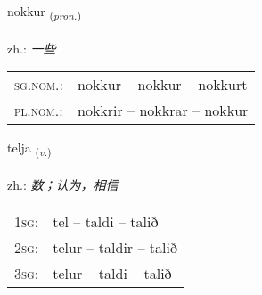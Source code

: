 \documentclass[frontgrid, backgrid]{flacards}\usepackage[]{graphicx}\usepackage[]{xcolor}
\begin{document}
\renewcommand{\flhead}{\vskip5pt \fboxsep=0pt {\small\bfseries\footnotesize Fornafn | 代词}}
\renewcommand{\fcfoot}{\vskip5pt \fboxsep=0pt \hspace{2pt}{\small\bfseries\footnotesize 1K}}

\renewcommand{\blhead}{\vskip5pt {\small\bfseries\footnotesize Fornafn | 代词 }}
\renewcommand{\bcfoot}{\vskip5pt \hspace{2pt}{\small\bfseries\footnotesize 1K}}


{nokkur \small{\textsubscript{(\textit{pron.})}} \\[1ex] %
\textphonetic{[nɔhkʏr]} \\
zh.: \emph{一些} \\  [2ex]
\renewcommand*{\arraystretch}{0.8}
\begin{tabular}{ll}
\textsc{sg.nom.}: & nokkur  --  nokkur -- nokkurt \\ 
\textsc{pl.nom.}: & nokkrir -- nokkrar -- nokkur
\end{tabular}
}

\renewcommand{\flhead}{\vskip5pt \fboxsep=0pt {\small\bfseries\footnotesize Sagnorð | 动词}}
\renewcommand{\fcfoot}{\vskip5pt \fboxsep=0pt \hspace{2pt}{\small\bfseries\footnotesize 1K}}

\renewcommand{\blhead}{\vskip5pt {\small\bfseries\footnotesize Sagnorð | 动词 }}
\renewcommand{\bcfoot}{\vskip5pt \hspace{2pt}{\small\bfseries\footnotesize 1K}}


{telja \small{\textsubscript{(\textit{v.})}} \\[1ex] %
\textphonetic{[tʰɛlja]} \\
zh.: \emph{数；认为，相信} \\  [2ex]
\renewcommand*{\arraystretch}{0.8}
\begin{tabular}{p{1cm}l}
\textsc{1sg}: & tel -- taldi -- talið \\ 
\textsc{2sg}: & telur -- taldir -- talið \\ 
\textsc{3sg}: & telur -- taldi -- talið \\ 
\end{tabular}
}
\end{document}
